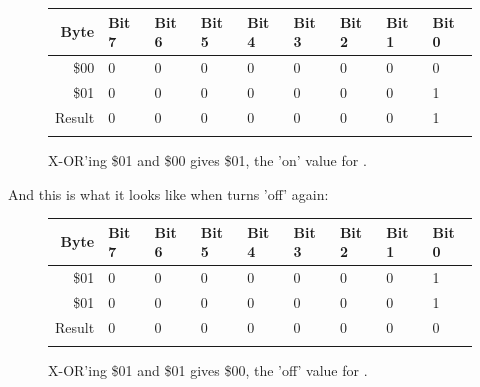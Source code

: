 \begin{figure}[H]
  {
    \setlength{\tabcolsep}{3.0pt}
    \setlength\cmidrulewidth{\heavyrulewidth} %
    \begin{adjustbox}{width=7cm,center}

      \begin{tabular}{rllllllll}
        \toprule
        Byte & Bit 7 & Bit 6 & Bit 5 & Bit 4 & Bit 3 & Bit 2 & Bit 1 & Bit 0        \\
        \midrule
        \$00 & 0 & 0 & 0 & 0 & 0 & 0 & 0 & 0 \\
        \$01 & 0 & 0 & 0 & 0 & 0 & 0 & 0 & 1 \\
        \midrule
        Result & 0 & 0 & 0 & 0 & 0 & 0 & 0 & 1 \\
        \addlinespace
        \bottomrule
      \end{tabular}

    \end{adjustbox}

  }\caption*{X-OR'ing \$01 and \$00 gives \$01, the 'on' value for .}
\end{figure}

And this is what it looks like when  turns  'off' again:
\begin{figure}[H]
  {
    \setlength{\tabcolsep}{3.0pt}
    \setlength\cmidrulewidth{\heavyrulewidth} %
    \begin{adjustbox}{width=7cm,center}

      \begin{tabular}{rllllllll}
        \toprule
        Byte & Bit 7 & Bit 6 & Bit 5 & Bit 4 & Bit 3 & Bit 2 & Bit 1 & Bit 0        \\
        \midrule
        \$01 & 0 & 0 & 0 & 0 & 0 & 0 & 0 & 1 \\
        \$01 & 0 & 0 & 0 & 0 & 0 & 0 & 0 & 1 \\
        \midrule
        Result & 0 & 0 & 0 & 0 & 0 & 0 & 0 & 0 \\
        \addlinespace
        \bottomrule
      \end{tabular}

    \end{adjustbox}

  }\caption*{X-OR'ing \$01 and \$01 gives \$00, the 'off' value for .}
\end{figure}
\clearpage

